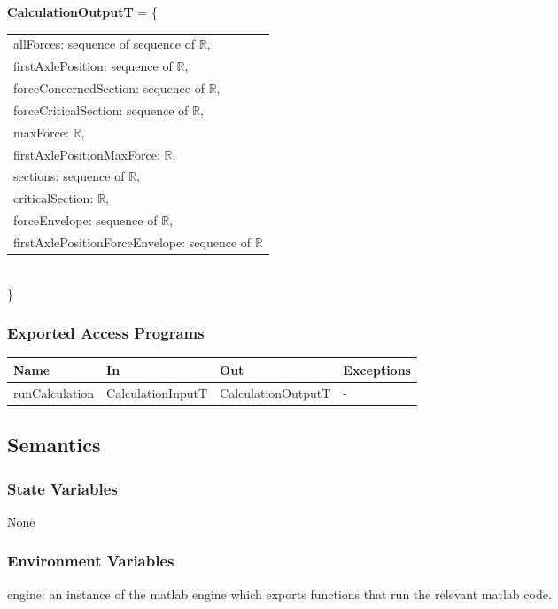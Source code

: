\documentclass[12pt, titlepage]{article}
\begin{document}
\noindent \textbf{CalculationOutputT} = \{\\
    \begin{tabular}{l}
    \noindent allForces: sequence of sequence of $\mathbb{R}$,\\

	\noindent firstAxlePosition: sequence of $\mathbb{R}$,\\

	\noindent forceConcernedSection: sequence of $\mathbb{R}$,\\
	\noindent forceCriticalSection: sequence of $\mathbb{R}$,\\

	\noindent maxForce: $\mathbb{R}$,\\
	\noindent firstAxlePositionMaxForce: $\mathbb{R}$,\\

    \noindent sections: sequence of $\mathbb{R}$,\\
    \noindent criticalSection: $\mathbb{R}$,\\

	\noindent forceEnvelope: sequence of $\mathbb{R}$,\\
	\noindent firstAxlePositionForceEnvelope: sequence of $\mathbb{R}$
 \end{tabular}
\\\}

\subsubsection{Exported Access Programs}
\begin{center}
\begin{tabular}{p{3cm} p{4cm} p{4cm} p{3cm}}
\hline
\textbf{Name} & \textbf{In} & \textbf{Out} & \textbf{Exceptions} \\
\hline
runCalculation & CalculationInputT & CalculationOutputT & - \\
\hline
\end{tabular}
\end{center}

\subsection{Semantics}

\subsubsection{State Variables}
None
\subsubsection{Environment Variables}
engine: an instance of the matlab engine which exports functions that run the relevant matlab code.
\end{document}
